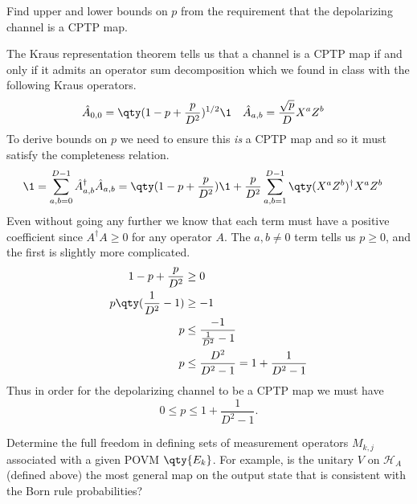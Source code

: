 \documentclass[
	pages,
	boxes,
	color=RoyalPurple
]{homework}
\makeatletter
\numberwithin{tcb@cnt@prob}{section}
\makeatother
\begin{document}
\begin{problem}
Find upper and lower bounds on $p$ from the requirement that the depolarizing channel is a CPTP map.
\end{problem}

\begin{solution}
    The Kraus representation theorem tells us that a channel is a CPTP map if and only if it admits an operator sum decomposition which we found in class with the following Kraus operators.
    \begin{align*}
        \hat{A}_{0,0} & = \qty(1 - p + \frac{p}{D^2})^{1/2}\1 & \hat{A}_{a,b} & = \frac{\sqrt{p}}{D}X^a Z^b
    \end{align*}
    To derive bounds on $p$ we need to ensure this \emph{is} a CPTP map and so it must satisfy the completeness relation.
    \begin{align*}
        \1  = \sum_{a, b = 0}^{D-1}\hat{A}_{a,b}^\dagger\hat{A}_{a,b} & = \qty(1 - p + \frac{p  }{D^2}) \1 + \frac{p}{D^2}\sum_{a, b = 1}^{D-1}\qty(X^a Z^b)^\dagger X^a Z^b %
    \end{align*}
    Even without going any further we know that each term must have a positive coefficient since $A^\dagger A \geq 0$ for any operator $A$. The $a, b \neq 0$ term tells us $p \geq 0$, and the first is slightly more complicated.
    \begin{align*}
        1 - p + \frac{p}{D^2}    & \geq 0                                           \\
        p\qty(\frac{1}{D^2} - 1) & \geq -1                                          \\
        p                        & \leq\frac{-1}{\frac{1}{D^2} - 1}                 \\
        p                        & \leq \frac{D^2}{D^2 - 1} = 1 + \frac{1}{D^2 - 1}
    \end{align*}
    Thus in order for the depolarizing channel to be a CPTP map we must have
    \begin{equation*}
        0\leq p \leq 1 + \frac{1}{D^2 - 1}.
    \end{equation*}
\end{solution}

\setcounter{section}{12}
\begin{problem}
Determine the full freedom in defining sets of measurement operators $M_{k,j}$ associated with a given POVM $\qty{E_k}$. For example, is the unitary $V$ on $\mathcal{H}_A$ (defined above) the most general map on the output state that is consistent with the Born rule probabilities?
\end{problem}
\end{document}
